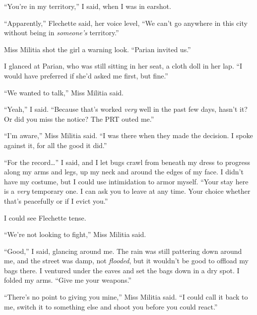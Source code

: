 ``You're in my territory,'' I said, when I was in earshot.



``Apparently,'' Flechette said, her voice level, ``We can't go anywhere in this city without being in \emph{someone's} territory.''



Miss Militia shot the girl a warning look.  ``Parian invited us.''



I glanced at Parian, who was still sitting in her seat, a cloth doll in her lap.  ``I would have preferred if she'd asked me first, but fine.''



``We wanted to talk,'' Miss Militia said.



``Yeah,'' I said.  ``Because that's worked \emph{very} well in the past few days, hasn't it?  Or did you miss the notice?  The PRT outed me.''



``I'm aware,'' Miss Militia said.  ``I was there when they made the decision.  I spoke against it, for all the good it did.''



``For the record\ldots'' I said, and I let bugs crawl from beneath my dress to progress along my arms and legs, up my neck and around the edges of my face.  I didn't have my costume, but I could use intimidation to armor myself.  ``Your stay here is a \emph{very} temporary one.  I can ask you to leave at any time.  Your choice whether that's peacefully or if I evict you.''



I could see Flechette tense.



``We're not looking to fight,'' Miss Militia said.



``Good,'' I said, glancing around me.  The rain was still pattering down around me, and the street was damp, not \emph{flooded}, but it wouldn't be good to offload my bags there.  I ventured under the eaves and set the bags down in a dry spot.  I folded my arms.  ``Give me your weapons.''



``There's no point to giving you mine,'' Miss Militia said.  ``I could call it back to me, switch it to something else and shoot you before you could react.''



